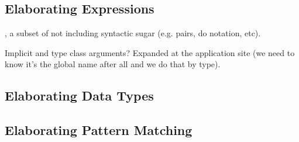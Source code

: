 
                             




\subsection{Elaborating Expressions}


\IdrisM{}, a subset of \Idris{} not including syntactic sugar (e.g. pairs, do notation, etc).

Implicit and type class arguments? Expanded at the application site (we need to know
it's the global name after all and we do that by type).

\subsection{Elaborating Data Types}

\subsection{Elaborating Pattern Matching}

